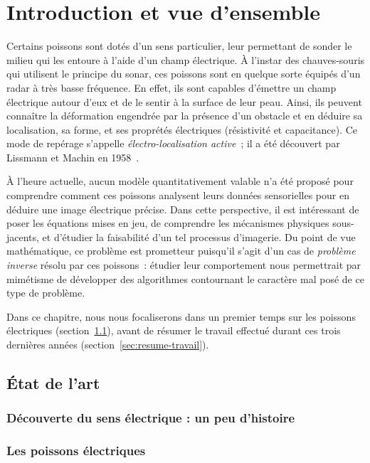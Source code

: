\chapter{Introduction et vue d'ensemble}

Certains poissons sont dotés d'un sens particulier, leur permettant de sonder 
le milieu qui les entoure à l'aide d'un champ électrique. À l'instar des 
chauves-souris qui utilisent le principe du sonar, ces poissons sont en
quelque sorte équipés d'un radar à très basse fréquence. En effet, ils sont capables 
d'émettre un champ électrique autour d'eux et de le sentir à la surface de leur peau.
Ainsi, ils peuvent connaître la déformation engendrée par la présence d'un obstacle et en déduire sa
localisation, sa forme, et ses proprétés électriques (résistivité et capacitance). Ce mode
de repérage s'appelle \emph{électro-localisation active}~; il a été découvert par 
Lissmann et Machin en 1958~\cite{lissmann1958mechanism}.

À l'heure actuelle, aucun modèle quantitativement valable n'a été proposé pour comprendre
comment ces poissons analysent leurs données sensorielles pour en déduire une image électrique précise.
Dans cette perspective, il est intéressant de poser les équations mises en jeu, 
de comprendre les mécanismes physiques sous-jacents, et d'étudier la faisabilité d'un tel
processus d'imagerie. Du point de vue mathématique, ce problème est prometteur puisqu'il 
s'agit d'un cas de \emph{problème inverse} résolu par ces poissons~: étudier leur
comportement nous permettrait par mimétisme de développer des algorithmes contournant
le caractère mal posé de ce type de problème.

Dans ce chapitre, nous nous focaliserons dans un premier temps sur les poissons
électriques (section~\ref{sec:etat-art}), avant de résumer le travail effectué
durant ces trois dernières années (section~\ref{sec:resume-travail}). 


\section{État de l'art}
\label{sec:etat-art}
\subsection{Découverte du sens électrique : un peu d'histoire}

\subsection{Les poissons électriques}

